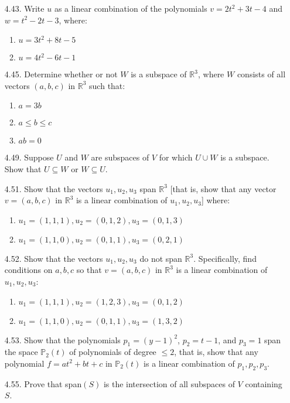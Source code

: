 \documentclass[12pt]{article}
\begin{document}
\begin{enumerate}
\begin{enumerate}
		
	\end{enumerate}
	
\item[4.43.] Write $u$ as a linear combination of the polynomials $v=2t^2+3t-4$ and $w=t^2-2t-3$, where:
	\begin{enumerate}
	\item $u=3t^2+8t-5$

	\item $u=4t^2-6t-1$
	\end{enumerate}
	
\item[4.45.] Determine whether or not $W$ is a subspace of $\mathbb{R}^3$, where $W$ consists of all vectors $(a,b,c)$ in $\mathbb{R}^3$ such that:
	\begin{enumerate}
	\item $a=3b$

	\item $a \leq b \leq c$

	\item $ab=0$
	\end{enumerate}

\item[4.49.] Suppose $U$ and $W$ are subspaces of $V$ for which $U \cup W$ is a subspace. Show that $U \subseteq W$ or $W \subseteq U$.

\item[4.51.] Show that the vectors $u_1,u_2,u_3$ span $\mathbb{R}^3$ [that is, show that any vector $v=(a,b,c)$ in $\mathbb{R}^3$ is a linear combination of $u_1,u_2,u_3$] where:
	\begin{enumerate}
	\item $u_1=(1,1,1),u_2=(0,1,2),u_3=(0,1,3)$
	
	\item $u_1=(1,1,0),u_2=(0,1,1),u_3=(0,2,1)$
	\end{enumerate}
	
\item[4.52.] Show that the vectors $u_1,u_2,u_3$ do not span $\mathbb{R}^3$. Specifically, find conditions on $a,b,c$ so that $v=(a,b,c)$ in $\mathbb{R}^3$ is a linear combination of $u_1,u_2,u_3$:
	\begin{enumerate}
	\item $u_1=(1,1,1),u_2=(1,2,3),u_3=(0,1,2)$
	
	\item $u_1=(1,1,0),u_2=(0,1,1),u_3=(1,3,2)$
	\end{enumerate}

\item[4.53.] Show that the polynomials $p_1=(y-1)^2$, $p_2=t-1$, and $p_3=1$ span the space $\mathbb{P}_2(t)$ of polynomials of degree $\leq 2$, that is, show that any polynomial $f=at^2+bt+c$ in $\mathbb{P}_2(t)$ is a linear combination of $p_1,p_2,p_3$.

\item[4.55.] Prove that span$(S)$ is the intersection of all subspaces of $V$ containing $S$.


\end{enumerate}
\end{document}

